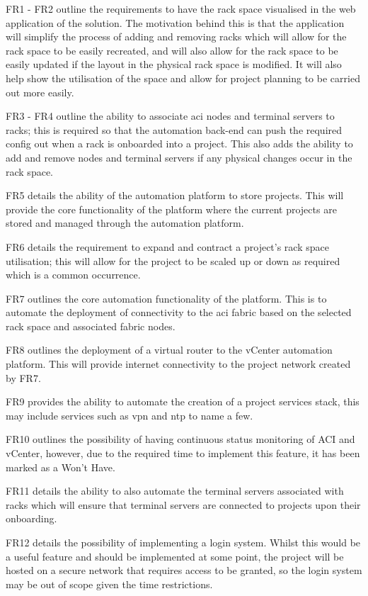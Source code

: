 FR1 - FR2 outline the requirements to have the rack space visualised in the web application of the solution. The motivation behind this is that the application will simplify the process of adding and removing racks which will allow for the rack space to be easily recreated, and will also allow for the rack space to be easily updated if the layout in the physical rack space is modified.
It will also help show the utilisation of the space and allow for project planning to be carried out more easily.

FR3 - FR4 outline the ability to associate \gls{aci} nodes and terminal servers to racks; this is required so that the automation back-end can push the required config out when a rack is onboarded into a project. This also adds the ability to add and remove nodes and terminal servers if any physical changes occur in the rack space.

FR5 details the ability of the automation platform to store projects. This will provide the core functionality of the platform where the current projects are stored and managed through the automation platform.

FR6 details the requirement to expand and contract a project's rack space utilisation; this will allow for the project to be scaled up or down as required which is a common occurrence.

FR7 outlines the core automation functionality of the platform. This is to automate the deployment of connectivity to the \gls{aci} fabric based on the selected rack space and associated fabric nodes.

FR8 outlines the deployment of a virtual router to the vCenter automation platform. This will provide internet connectivity to the project network created by FR7.

FR9 provides the ability to automate the creation of a project services stack, this may include services such as \gls{vpn} and \gls{ntp} to name a few.

FR10 outlines the possibility of having continuous status monitoring of ACI and vCenter, however, due to the required time to implement this feature, it has been marked as a Won’t Have.

FR11 details the ability to also automate the terminal servers associated with racks which will ensure that terminal servers are connected to projects upon their onboarding.

FR12 details the possibility of implementing a login system. Whilst this would be a useful feature and should be implemented at some point, the project will be hosted on a secure network that requires access to be granted, so the login system may be out of scope given the time restrictions.
